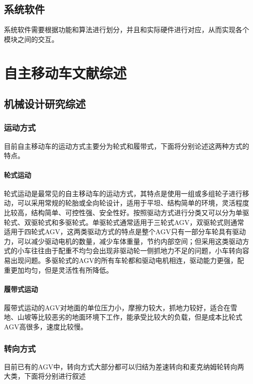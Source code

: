 \documentclass{report}
\begin{document}
\section{系统软件}
\label{sec:label}
系统软件需要根据功能和算法进行划分，并且和实际硬件进行对应，从而实现各个模块之间的交互。


\chapter{自主移动车文献综述}
\label{sec:label}


\section{机械设计研究综述}
\subsection{运动方式}
\label{subsec:label}
目前自主移动车的运动方式主要分为轮式和履带式，下面将分别论述这两种方式的特点。
\subsubsection{轮式运动}
\label{subsec:label}
轮式运动是最常见的自主移动车的运动方式，其特点是使用一组或多组轮子进行移动，可以采用常规的轮胎或全向轮设计，适用于平坦、结构简单的环境，灵活程度比较高，结构简单、可控性强、安全性好。按照驱动方式进行分类又可以分为单驱轮式、双驱轮式和多驱轮式。单驱轮式通常适用于三轮式AGV，双驱轮式则通常适用于四轮式AGV，这两类驱动方式的特点是整个AGV只有一部分车轮具有驱动力，可以减少驱动电机的数量，减少车体重量，节约内部空间；但采用这类驱动方式的小车往往由于配重不均匀会出现非驱动轮一侧抓地力不足的问题，小车转向容易出现问题。多驱轮式的AGV的所有车轮都和驱动电机相连，驱动能力更强，配重更加均匀，但是灵活性有所降低。
\subsubsection{履带式运动}
\label{subsec:label}
履带式运动的AGV对地面的单位压力小，摩擦力较大，抓地力较好，适合在雪地、山坡等比较恶劣的地面环境下工作，能承受比较大的负载，但是成本比轮式AGV高很多，速度比较慢。
\newpage
\subsection{转向方式}
\label{subsec:label}
目前已有的AGV中，转向方式大部分都可以归结为差速转向和麦克纳姆轮转向两大类，下面将分别进行叙述
\end{document}
